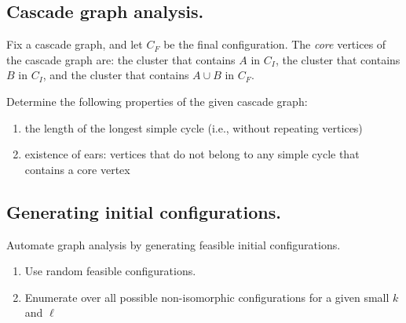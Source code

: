 \documentclass[a4paper,anonymous,USenglish]{lipics-v2019}
\begin{document}
\subsection{Cascade graph analysis.}

Fix a cascade graph, and let $C_F$ be the final configuration.
The \emph{core} vertices of the cascade graph are: the cluster that contains $A$
in $C_I$, the cluster that contains $B$ in $C_I$, and the cluster that contains
$A\cup B$ in $C_F$.

Determine the following properties of the given cascade graph:
\begin{enumerate}
    \item the length of the longest simple cycle (i.e., without repeating
        vertices)
    \item existence of ears: vertices that do not belong to any simple cycle
        that contains a core vertex
\end{enumerate}

\subsection{Generating initial configurations.}

Automate graph analysis by generating feasible initial configurations.
\begin{enumerate}
    \item Use
random feasible configurations.
\item Enumerate over all possible non-isomorphic configurations for a given small $k$
    and $\ell$
\end{enumerate}

  
  


\appendix
\end{document}
